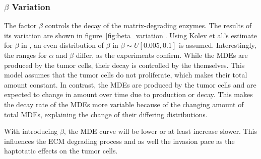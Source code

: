 \subsubsection*{$\beta$ Variation}
The factor $\beta$ controls the decay of the matrix-degrading enzymes. The results of its variation are shown in figure~\ref{fig:beta_variation}. Using Kolev et al.'s estimate for $\beta$ in \cite{Kolev2010}, an even distribution of $\beta$ in $\beta \sim U[0.005, 0.1]$ is assumed. Interestingly, the ranges for $\alpha$ and $\beta$ differ, as the experiments confirm. While the MDEs are produced by the tumor cells, their decay is controlled by the themselves. This model assumes that the tumor cells do not proliferate, which makes their total amount constant. In contrast, the MDEs are produced by the tumor cells and are expected to change in amount over time due to production or decay. This makes the decay rate of the MDEs more variable because of the changing amount of total MDEs, explaining the change of their differing distributions.

With introducing $\beta$, the MDE curve will be lower or at least increase slower. This influences the ECM degrading process and as well the invasion pace as the haptotatic effects on the tumor cells. 


